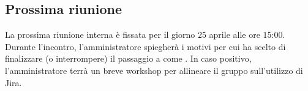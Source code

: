 \subsection{Prossima riunione}
\par La prossima riunione interna è fissata per il giorno 25 aprile alle ore 15:00. Durante l'incontro, l'amministratore spiegherà i motivi per cui ha scelto di finalizzare (o interrompere) il passaggio a  come . In caso positivo, l'amministratore terrà un breve workshop per allineare il gruppo sull'utilizzo di Jira.